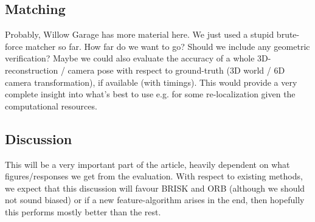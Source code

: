 \documentclass[a4paper,10pt]{article}
\begin{document}
\subsection{Matching}
Probably, Willow Garage has more material here. We just used a stupid brute-force matcher so far. How far do we want to go? Should we include any geometric verification? Maybe we could also evaluate the accuracy of a whole 3D-reconstruction / camera pose with respect to ground-truth (3D world / 6D camera transformation), if available (with timings). This would provide a very complete insight into what's best to use e.g. for some re-localization given the computational resources.

\subsection{Discussion}
This will be a very important part of the article, heavily dependent on what figures/responses we get from the evaluation. With respect to existing methods, we expect that this discussion will favour BRISK and ORB (although we should not sound biased) or if a new feature-algorithm arises in the end, then hopefully this performs mostly better than the rest.
\end{document}
